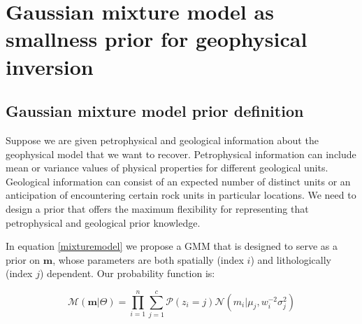 \documentclass[extra]{gji} %
\begin{document}
\section{Gaussian mixture model as smallness prior for geophysical inversion} \label{section:Framework}


\subsection{Gaussian mixture model prior definition} \label{section:GMMprior}

Suppose we are given petrophysical and geological information about the geophysical model that we want to recover. Petrophysical information can include mean or variance values of physical properties for different geological units. Geological information can consist of an expected number of distinct units or an anticipation of encountering certain rock units in particular locations. We need to design a prior that offers the maximum flexibility for representing that petrophysical and geological prior knowledge.

In equation \ref{mixturemodel} we propose a GMM that is designed to serve as a prior on $\mathbf{m}$, whose parameters are both spatially (index $i$) and lithologically (index $j$) dependent. Our probability function is:

\begin{equation}
\mathcal{M}(\mathbf{m}|\Theta) = \prod_{i=1}^n \sum_{j=1}^c \mathcal{P}(z_{i}=j)\mathcal{N}({m}_i|{\mu}_j, {w}_{i}^{-2}\sigma_j^2)
\label{mixturemodel}
\end{equation}
\end{document}
